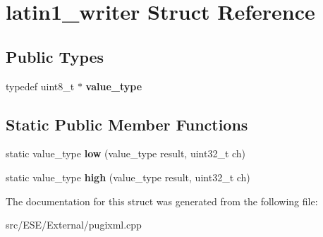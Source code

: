 \hypertarget{structlatin1__writer}{\section{latin1\-\_\-writer Struct Reference}
\label{structlatin1__writer}
}
\subsection*{Public Types}
\begin{DoxyCompactItemize}
\item 
\hypertarget{structlatin1__writer_af9228600fa7eecd793cc3d927d46eb1a}{typedef uint8\-\_\-t $\ast$ {\bfseries value\-\_\-type}}\label{structlatin1__writer_af9228600fa7eecd793cc3d927d46eb1a}

\end{DoxyCompactItemize}
\subsection*{Static Public Member Functions}
\begin{DoxyCompactItemize}
\item 
\hypertarget{structlatin1__writer_ab5d7a833d29d66031420686ca67b1f6e}{static value\-\_\-type {\bfseries low} (value\-\_\-type result, uint32\-\_\-t ch)}\label{structlatin1__writer_ab5d7a833d29d66031420686ca67b1f6e}

\item 
\hypertarget{structlatin1__writer_a0e48c306ebe556f267404a9624f00554}{static value\-\_\-type {\bfseries high} (value\-\_\-type result, uint32\-\_\-t ch)}\label{structlatin1__writer_a0e48c306ebe556f267404a9624f00554}

\end{DoxyCompactItemize}


The documentation for this struct was generated from the following file\-:\begin{DoxyCompactItemize}
\item 
src/\-E\-S\-E/\-External/pugixml.\-cpp\end{DoxyCompactItemize}
